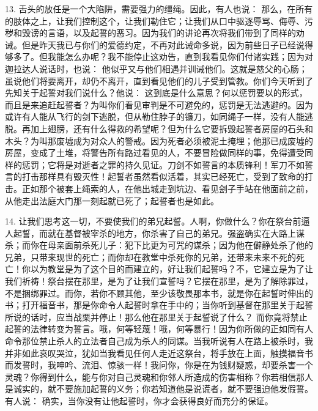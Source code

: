 13. 舌头的放任是一个大陷阱，需要强力的缰绳。因此，有人也说： 那么，在所有的肢体之上，让我们控制这个，让我们勒住它；让我们从口中驱逐辱骂、侮辱、污秽和毁谤的言语，以及起誓的恶习。因为我们的讲论再次将我们带到了同样的劝诫。但是昨天我已与你们的爱德约定，不再对此诫命多说，因为前些日子已经说得够多了。但我能怎么办呢？我不能停止这劝告，直到我看见你们付诸实践；因为对迦拉达人说话时，也说： 他似乎又与他们相遇并训诫他们。这就是慈父的心肠；虽说他们将要离开，却仍不离开，直到看见他们的儿子受到管教。你们今天听到了先知关于起誓对我们说什么？他说： 这到底是什么意思？何以惩罚要以的形式，而且是来追赶起誓者？为叫你们看见审判是不可避免的，惩罚是无法逃避的。因为或许有人能从飞行的剑下逃脱，但从勒住脖子的镰刀，如同绳子一样，没有人能逃脱。再加上翅膀，还有什么得救的希望呢？但为什么它要拆毁起誓者房屋的石头和木头？为叫那废墟成为对众人的警戒。因为死者必须被泥土掩埋；他那已成废墟的房屋，变成了土堆，将警告所有路过看见的人，不要冒险做同样的事，免得遭受同样的惩罚；它将是对逝者之罪的持久见证。刀剑不如誓言的本质锋利！军刀不如誓言的打击那样具有毁灭性！起誓者虽然看似活着，其实已经死亡，受到了致命的打击。正如那个被套上绳索的人，在他出城走到坑边、看见刽子手站在他面前之前，从他走出法庭大门那一刻起就已死了；起誓者也是如此。\par

14. 让我们思考这一切，不要使我们的弟兄起誓。人啊，你做什么？你在祭台前逼人起誓，而就在基督被宰杀的地方，你杀害了自己的弟兄。强盗确实在大路上谋杀；而你在母亲面前杀死儿子：犯下比更为可咒的谋杀；因为他在僻静处杀了他的兄弟，只带来现世的死亡；而你却在教堂中杀死你的兄弟，还带来未来不死的死亡！你以为教堂是为了这个目的而建立的，好让我们起誓吗？不，它建立是为了让我们祈祷！祭台摆在那里，是为了让我们宣誓吗？它摆在那里，是为了解除罪过，不是捆绑罪过。而你，若你不顾其他，至少该敬畏那本书，就是你在起誓时伸出的书；打开福音书，那是你命令人起誓时拿在手中的；当你听到基督在那里关于起誓所说的话时，应当战栗并停止！那么他在那里关于起誓说了什么？ 而你竟将禁止起誓的法律转变为誓言。哦，何等轻蔑！哦，何等暴行！因为你所做的正如同有人命令那位禁止杀人的立法者自己成为杀人的同谋。当我听说有人在路上被杀时，我并非如此哀叹哭泣，犹如当我看见任何人走近这祭台，将手放在上面，触摸福音书而发誓时，我呻吟、流泪、惊骇一样！我问你，你是在为钱财疑惑，却要杀害一个灵魂？你得到什么，能与你对自己灵魂和你邻人所造成的伤害相称？你若相信那人是诚实的，就不要施加起誓的义务；你若知道他是说谎者，就不要强迫他发假誓。有人说： 确实，当你没有让他起誓时，你才会获得良好而充分的保证。\par

